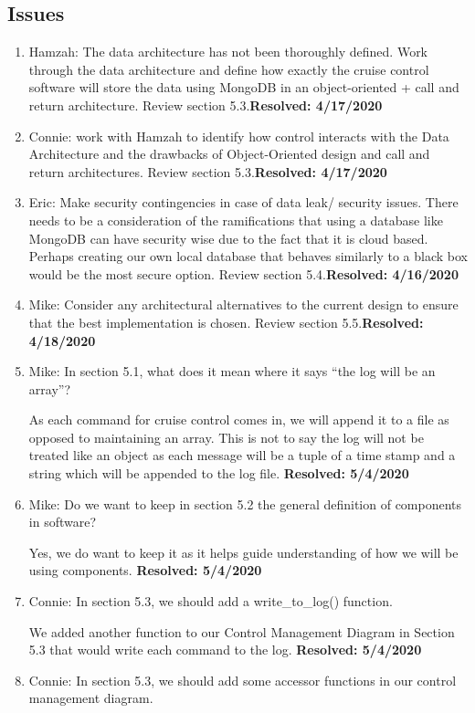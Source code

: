 \documentclass[preprint,11pt,3p]{article}
\begin{document}
\subsection{Issues}
\begin{enumerate} 
	\item Hamzah: The data architecture has not been thoroughly defined. Work through the data architecture and define how exactly the cruise control software will store the data using MongoDB in an object-oriented + call and return architecture. Review section 5.3.\textbf{Resolved: 4/17/2020}
	\item Connie: work with Hamzah to identify how control interacts with the Data Architecture and the drawbacks of Object-Oriented design and call and return architectures. Review section 5.3.\textbf{Resolved: 4/17/2020}
	\item Eric: Make security contingencies in case of data leak/ security issues. There needs to be a consideration of the ramifications that using a database like MongoDB can have security wise due to the fact that it is cloud based. Perhaps creating our own local database that behaves similarly to a black box would be the most secure option. Review section 5.4.\textbf{Resolved: 4/16/2020}
	\item Mike: Consider any architectural alternatives to the current design to ensure that the best implementation is chosen. Review section 5.5.\textbf{Resolved: 4/18/2020}
	\item Mike: In section 5.1, what does it mean where it says “the log will be an array”?\par
			As each command for cruise control comes in, we will append it to a file as opposed to maintaining an array. This is not to say the log will not be treated like an object as each message will be a tuple of a time stamp and a string which will be appended to the log file. \textbf{Resolved: 5/4/2020}
	\item Mike: Do we want to keep in section 5.2 the general definition of components in software?\par
			Yes, we do want to keep it as it helps guide understanding of how we will be using components. \textbf{Resolved: 5/4/2020}
	\item Connie: In section 5.3, we should add a write_to_log() function.\par
			We added another function to our Control Management Diagram in Section 5.3 that would write each command to the log. \textbf{Resolved: 5/4/2020}
	\item Connie: In section 5.3, we should add some accessor functions in our control management diagram.\par

\end{enumerate}
\end{document}
